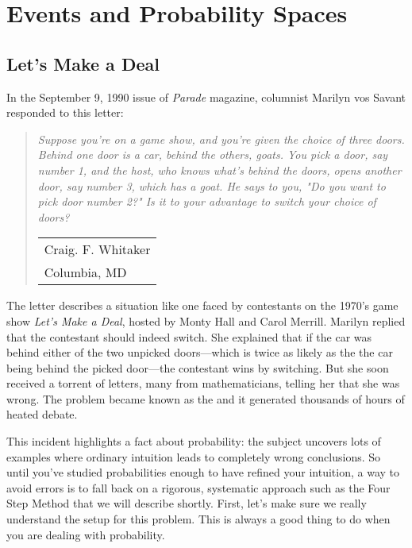 \chapter{Events and Probability Spaces}\label{probability_chap}

\section{Let's Make a Deal}

In the September 9, 1990 issue of \emph{Parade} magazine, columnist
Marilyn vos Savant responded to this letter:


\begin{quote}
\emph{Suppose you're on a game show, and you're given the
choice of three doors.  Behind one door is a car, behind the others,
goats.  You pick a door, say number 1, and the host, who knows what's
behind the doors, opens another door, say number 3, which has a goat.
He says to you, "Do you want to pick door number 2?"  Is it to your
advantage to switch your choice of doors?}
\begin{flushright}
\begin{tabular}{l}
Craig. F. Whitaker \\
Columbia, MD
\end{tabular}
\end{flushright}
\end{quote}

The letter describes a situation like one faced by contestants on the
1970's game show \emph{Let's Make a Deal}, hosted by Monty Hall and
Carol Merrill.  Marilyn replied that the contestant should indeed
switch.  She explained that if the car was behind either of the two
unpicked doors---which is twice as likely as the the car being behind
the picked door---the contestant wins by switching.  But she soon
received a torrent of letters, many from mathematicians, telling her
that she was wrong.  The problem became known as the  and it generated thousands of hours of heated debate.

This incident highlights a fact about probability: the subject uncovers
lots of examples where ordinary intuition leads to completely wrong
conclusions.  So until you've studied probabilities enough to have
refined your intuition, a way to avoid errors is to fall back on a
rigorous, systematic approach such as the Four Step Method that we
will describe shortly.  First, let's make sure we really understand
the setup for this problem.  This is always a good thing to do when
you are dealing with probability.

